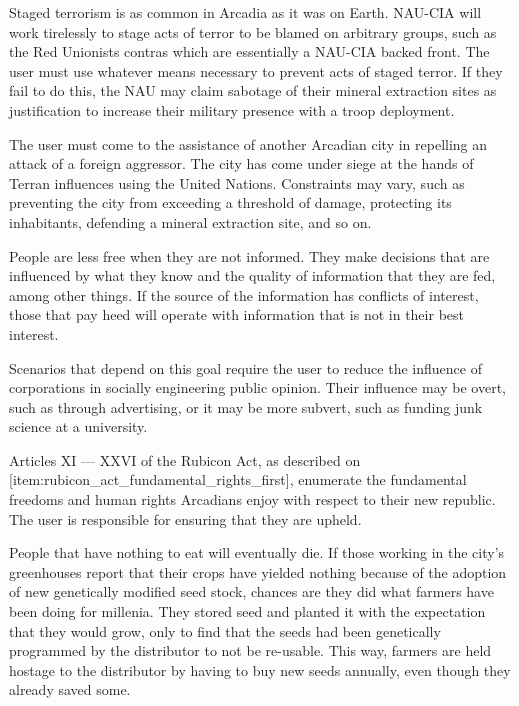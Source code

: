 
Staged terrorism is as common in Arcadia as it was on Earth. NAU-CIA will work tirelessly to stage acts of terror to be blamed on arbitrary groups, such as the Red Unionists contras which are essentially a NAU-CIA backed front. The user must use whatever means necessary to prevent acts of staged terror. If they fail to do this, the NAU may claim sabotage of their mineral extraction sites as justification to increase their military presence with a troop deployment.


The user must come to the assistance of another Arcadian city in repelling an attack of a foreign aggressor. The city has come under siege at the hands of Terran influences using the United Nations. Constraints may vary, such as preventing the city from exceeding a threshold of damage, protecting its inhabitants, defending a mineral extraction site, and so on.


People are less free when they are not informed. They make decisions that are influenced by what they know and the quality of information that they are fed, among other things. If the source of the information has conflicts of interest, those that pay heed will operate with information that is not in their best interest. 

Scenarios that depend on this goal require the user to reduce the influence of corporations in socially engineering public opinion. Their influence may be overt, such as through advertising, or it may be more subvert, such as funding junk science at a university. 


Articles XI --- XXVI of the Rubicon Act, as described on [item:rubicon_act_fundamental_rights_first], enumerate the fundamental freedoms and human rights Arcadians enjoy with respect to their new republic. The user is responsible for ensuring that they are upheld.


People that have nothing to eat will eventually die. If those working in the city's greenhouses report that their crops have yielded nothing because of the adoption of new genetically modified seed stock, chances are they did what farmers have been doing for millenia. They stored seed and planted it with the expectation that they would grow, only to find that the seeds had been genetically programmed by the distributor to not be re-usable. This way, farmers are held hostage to the distributor by having to buy new seeds annually, even though they already saved some.

